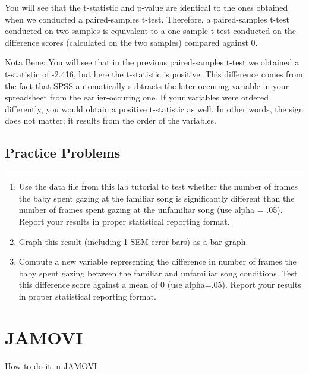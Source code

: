 \documentclass[
]{book}
\begin{document}
You will see that the t-statistic and p-value are identical to the ones obtained when we conducted a paired-samples t-test. Therefore, a paired-samples t-test conducted on two samples is equivalent to a one-sample t-test conducted on the difference scores (calculated on the two samples) compared against 0.

Nota Bene: You will see that in the previous paired-samples t-test we obtained a t-statistic of -2.416, but here the t-statistic is positive. This difference comes from the fact that SPSS automatically subtracts the later-occuring variable in your spreadsheet from the earlier-occuring one. If your variables were ordered differently, you would obtain a positive t-statistic as well. In other words, the sign does not matter; it results from the order of the variables.

\hypertarget{practice-problems-5}{%
\subsection{Practice Problems}\label{practice-problems-5}}

\begin{center}\rule{0.5\linewidth}{0.5pt}\end{center}

\begin{enumerate}
\def\labelenumi{\arabic{enumi}.}
\item
  Use the data file from this lab tutorial to test whether the number of frames the baby spent gazing at the familiar song is significantly different than the number of frames spent gazing at the unfamiliar song (use alpha = .05). Report your results in proper statistical reporting format.
\item
  Graph this result (including 1 SEM error bars) as a bar graph.
\item
  Compute a new variable representing the difference in number of frames the baby spent gazing between the familiar and unfamiliar song conditions. Test this difference score against a mean of 0 (use alpha=.05). Report your results in proper statistical reporting format.
\end{enumerate}

\hypertarget{jamovi-6}{%
\section{JAMOVI}\label{jamovi-6}}

How to do it in JAMOVI
\end{document}
